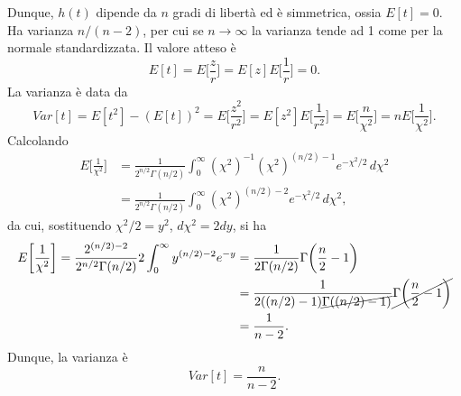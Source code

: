 \documentclass{article}
\theoremstyle{remark}
\begin{document}
Dunque, $h(t)$ dipende da $n$ gradi di libertà ed è simmetrica, ossia $E[t] = 0$. Ha varianza $n/(n - 2)$, per cui se $n \to \infty$ la varianza tende ad 1 come per la normale standardizzata. Il valore atteso è 
\begin{equation}
    E[t] = E\bigg[\frac{z}{r}\bigg] = E[z]E\bigg[\frac{1}{r}\bigg] = 0.
\end{equation}
La varianza è data da
\begin{equation}
    Var[t] = E[t^2] - (E[t])^2 = E\bigg[\frac{z^2}{r^2}\bigg] = E[z^2]E\bigg[\frac{1}{r^2}\bigg] = E\bigg[\frac{n}{\chi^2}\bigg] =nE\bigg[\frac{1}{\chi^2}\bigg].
\end{equation}
Calcolando
\begin{equation}
    \begin{split}
        E\bigg[\frac{1}{\chi^2}\bigg] &= \frac{1}{2^{n/2}\Gamma(n/2)}\int_0^\infty(\chi^2)^{-1}(\chi^2)^{(n/2) - 1}e^{-\chi^2/2}\,d\chi^2 \\
        &= \frac{1}{2^{n/2}\Gamma(n/2)}\int_0^\infty(\chi^2)^{(n/2) - 2}e^{-\chi^2/2}\,d\chi^2,
    \end{split}
\end{equation}
da cui, sostituendo $\chi^2/2 = y^2$, $d\chi^2 = 2dy$, si ha
\begin{equation}
    \begin{split}
        E\bigg[\frac{1}{\chi^2}\bigg] = \frac{2^{(n/2) - 2}}{2^{n/2}\Gamma(n/2)}2\int_0^\infty y^{(n/2) - 2}e^{-y} &= \frac{1}{2\Gamma(n/2)}\Gamma\bigg(\frac{n}{2} - 1\bigg) \\
        &= \frac{1}{2((n/2) - 1)\cancel{\Gamma((n/2)- 1)}}\cancel{\Gamma\bigg(\frac{n}{2} - 1\bigg)} \\
        &= \frac{1}{n - 2}.
    \end{split}
\end{equation}
Dunque, la varianza è
\begin{equation}
    Var[t] = \frac{n}{n - 2}.
\end{equation}
\end{document}
